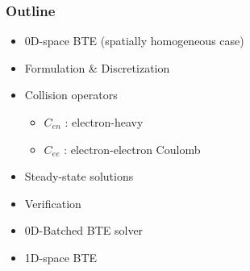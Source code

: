 \documentclass[mathserif, aspectratio=169]{beamer}
\begin{document}
\begin{frame}
	\frametitle{Outline}
	\begin{center}
		\begin{itemize}
			\item 0D-space BTE (spatially homogeneous case)
			\item Formulation \& Discretization
			\item Collision operators
			\begin{itemize}
				\item $C_{en}$ : electron-heavy 
				\item $C_{ee}$ : electron-electron Coulomb
			\end{itemize}
			\item Steady-state solutions
			\item Verification
			\item 0D-Batched BTE solver
			\item 1D-space BTE
		\end{itemize}
	\end{center}
\end{frame}
\end{document}
